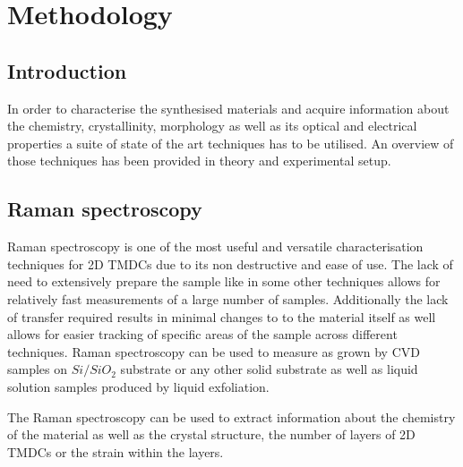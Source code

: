 \chapter{Methodology}

\section{Introduction}

In order to characterise the synthesised materials and acquire information about the chemistry, crystallinity, morphology as well as its optical and electrical properties a suite of state of the art techniques has to be utilised. An overview of those techniques has been provided in theory and experimental setup.

\section{Raman spectroscopy}

Raman spectroscopy is one of the most useful and versatile characterisation techniques for 2D TMDCs due to its non destructive and ease of use. The lack of need to extensively prepare the sample like in some other techniques allows for relatively fast measurements of a large number of samples. Additionally the lack of transfer required results in minimal changes to to the material itself as well allows for easier tracking of specific areas of the sample across different techniques. Raman spectroscopy can be used to measure as grown by CVD samples on $Si/SiO_2$ substrate or any other solid substrate as well as liquid solution samples produced by liquid exfoliation.

The Raman spectroscopy can be used to extract information about the chemistry of the material as well as the crystal structure, the number of layers of 2D TMDCs or the strain within the layers. 

